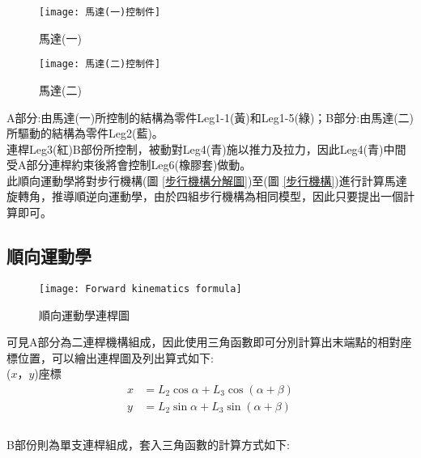 \begin{figure}[htbp]
  \begin{minipage}[t]{0.5\linewidth}
    \centering
    \texttt{[image: 馬達(一)控制件]}
    \caption{馬達(一)}
    \label{馬達(一)控制件}
  \end{minipage}
  \hfill
  \begin{minipage}[t]{0.4\linewidth}
    \centering
    \texttt{[image: 馬達(二)控制件]}
    \caption{馬達(二)}
    \label{馬達(二)控制件}
  \end{minipage}
\end{figure}

A部分:由馬達(一)所控制的結構為零件Leg1-1(黃)和Leg1-5(綠)；B部分:由馬達(二)所驅動的結構為零件Leg2(藍)。\\

連桿Leg3(紅)B部份所控制，被動對Leg4(青)施以推力及拉力，因此Leg4(青)中間受A部分連桿約束後將會控制Leg6(橡膠套)做動。\\

此順向運動學將對步行機構(圖 \ref{步行機構分解圖})至(圖 \ref{步行機構})進行計算馬達旋轉角，推導順逆向運動學，由於四組步行機構為相同模型，因此只要提出一個計算即可。
\newpage

\subsection{順向運動學}

\begin{figure}[hbt!]
\begin{center}
\texttt{[image: Forward kinematics formula]}
\caption{\Large 順向運動學連桿圖}\label{Forward kinematics formula}
\end{center}
\end{figure}

可見A部分為二連桿機構組成，因此使用三角函數即可分別計算出末端點的相對座標位置，可以繪出連桿圖及列出算式如下:\\

($x$，$y$)座標
\[
\begin{aligned}
x&=L_{2}\cos \alpha +L_{3}\cos \left( \alpha +\beta \right)\\
y&=L_{2}\sin \alpha +L_{3}\sin \left( \alpha +\beta \right)\\
\end{aligned}
\]\\

B部份則為單支連桿組成，套入三角函數的計算方式如下:\\

